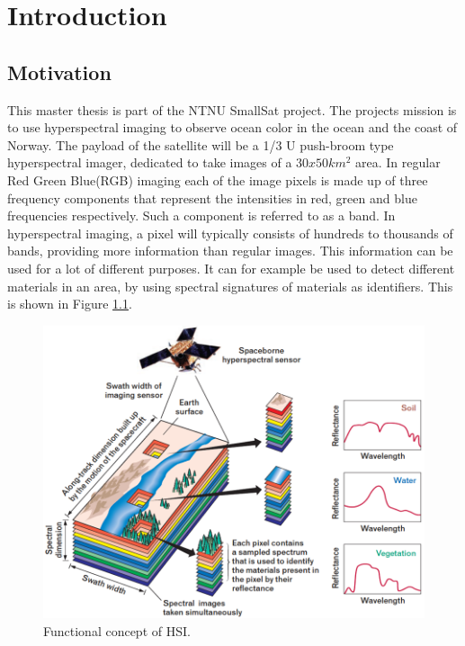 \newpage
\chapter{Introduction}
\label{sec:introduction}
\section{Motivation}

This master thesis is part of the NTNU SmallSat \cite{SmallSat_project_description} project. The projects mission is to use hyperspectral imaging to observe ocean color in the ocean and the coast of Norway. The payload of the satellite will be a 1/3 U push-broom type hyperspectral imager, dedicated to take images of a $30x50 km^2$ area. In regular Red Green Blue(RGB) imaging each of the image pixels is made up of three frequency components that represent the intensities in red, green and blue frequencies respectively. Such a component is referred to as a band. In hyperspectral imaging, a pixel will typically consists of hundreds to thousands of bands, providing more information than regular images. This information can be used for a lot of different purposes. It can for example be used to detect different materials in an area, by using spectral signatures of materials as identifiers. This is shown in Figure \ref{fig:HSI_concept}.\\

\begin{figure}[H]
\centering
   \includegraphics[scale=0.4]{images/Imaging-Spectroscopy-Concept.png}
  \caption{ Functional concept of HSI.\cite{HSI_concept} } 
  \label{fig:HSI_concept}
\end{figure}


